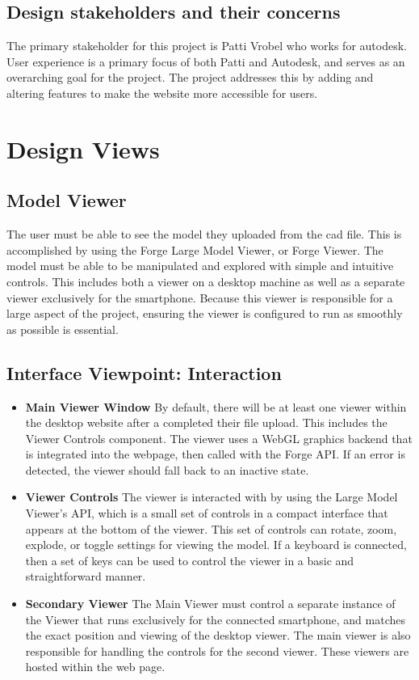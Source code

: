 \documentclass[letterpaper, 10pt, draftclsnofoot, compsoc, onecolumn]{IEEEtran}
\begin{document}
\subsection{Design stakeholders and their concerns}
	The primary stakeholder for this project is Patti Vrobel who works for autodesk. User experience is a primary focus of both Patti and Autodesk, and serves as an overarching goal for the project. The project addresses this by adding and altering features to make the website more accessible for users.

\section{Design Views}

\subsection{Model Viewer}
\label{modelView}
The user must be able to see the model they uploaded from the cad file. This is accomplished by using the Forge Large Model Viewer, or Forge Viewer. The model must be able to be manipulated and explored with simple and intuitive controls. This includes both a viewer on a desktop machine as well as a separate viewer exclusively for the smartphone. Because this viewer is responsible for a large aspect of the project, ensuring the viewer is configured to run as smoothly as possible is essential.


\subsection{Interface Viewpoint: Interaction}
\begin{itemize}
	\item[]\textbf{Main Viewer Window} By default, there will be at least one viewer within the desktop website after a completed their file upload.  This includes the Viewer Controls component. The viewer uses a WebGL graphics backend that is integrated into the webpage, then called with the Forge API. If an error is detected, the viewer should fall back to an inactive state.
	
	\item[]\textbf{Viewer Controls} The viewer is interacted with by using the Large Model Viewer's API, which is a small set of controls in a compact interface that appears at the bottom of the viewer. This set of controls can rotate, zoom, explode, or toggle settings for viewing the model. If a keyboard is connected, then a set of keys can be used to control the viewer in a basic and straightforward manner.
	
	\item[]\textbf{Secondary Viewer}  The Main Viewer must control a separate instance of the Viewer that runs exclusively for the connected smartphone, and matches the exact position and viewing of the desktop viewer. The main viewer is also responsible for handling the controls for the second viewer. These viewers are hosted within the web page.
	

\end{itemize}
\end{document}

